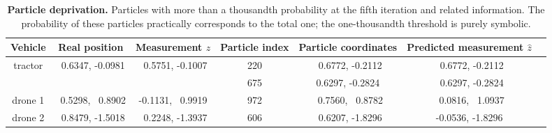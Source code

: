 \documentclass[letterpaper,twocolumn,10pt]{article}
\begin{document}
\begin{table}[htb!]
    \centering
    \begin{tabular}{ccccccc}\hline
    \textbf{Vehicle} 
    & \textbf{Real position}
    & \textbf{Measurement} $z$
    & \textbf{Particle index} 
    & \textbf{Particle coordinates}
    & \textbf{Predicted measurement} $\hat{z}$\\ \hline
    tractor & \ 0.6347, -0.0981 & \ 0.5751, -0.1007 & 220 & \ 0.6772, -0.2112 & 
    \ 0.6772, -0.2112 \\
            &                 &                 & 675 & 0.6297, 
    -0.2824 & \ 0.6297, -0.2824 \\
    \hline
    drone 1 & \ 0.5298, \ 0.8902 & -0.1131, \ 0.9919 & 972 & \ 0.7560, 
    \ 0.8782 & \ 0.0816, \ 1.0937 \\ 
    \hline
    drone 2 & \ 0.8479, -1.5018 & \ 0.2248, -1.3937 & 606 & \ 0.6207, 
    -1.8296 & -0.0536, -1.8296 \\          
    \end{tabular}
    \caption{\textbf{Particle deprivation.} Particles with more than a thousandth probability at the fifth iteration and related information. The probability of these particles practically corresponds to the total one; the one-thousandth threshold is purely symbolic. }
    \label{tab:1}

\end{table}

{\footnotesize 
}
\end{document}
